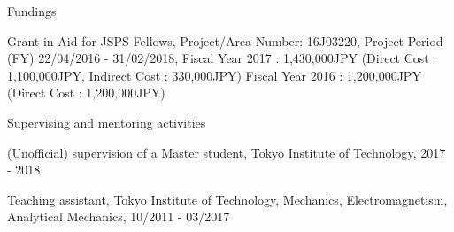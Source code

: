 \documentclass[a4paper]{resume} %
\begin{document}
\begin{rSection}{Fundings}
\begin{etaremune}
    \item
Grant-in-Aid for JSPS Fellows, Project/Area Number: 16J03220, Project Period (FY)    22/04/2016 - 31/02/2018,
Fiscal Year 2017 : 1,430,000JPY (Direct Cost : 1,100,000JPY, Indirect Cost : 330,000JPY)
Fiscal Year 2016 : 1,200,000JPY (Direct Cost : 1,200,000JPY)

\end{etaremune}
\end{rSection}

\begin{rSection}{Supervising and mentoring activities}
	\begin{etaremune}
    \item (Unofficial) supervision of a Master student, Tokyo Institute of Technology, 2017 - 2018
    \item Teaching assistant, Tokyo Institute of Technology, Mechanics, Electromagnetism, Analytical Mechanics, 10/2011 - 03/2017
\end{etaremune}
\end{rSection}
\end{document}
